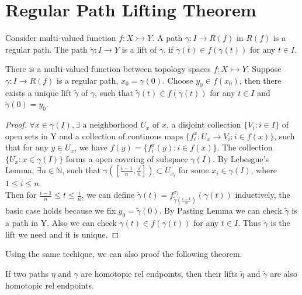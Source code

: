 \documentclass[12pt]{article}
\newenvironment{definition}[2][Definition]{\begin{trivlist}
\item[\hskip \labelsep {\bfseries #1}\hskip \labelsep {\bfseries #2.}]}{\end{trivlist}}
\newenvironment{theorem}[2][Theorem]{\begin{trivlist}
\item[\hskip \labelsep {\bfseries #1}\hskip \labelsep {\bfseries #2.}]}{\end{trivlist}}
\begin{document}
\section{Regular Path Lifting Theorem}
\begin{definition}{2.1}
    Consider multi-valued function $f:X\rightarrowtail Y$. A path $\gamma: I\to R(f)$ in $R(f)$ is a regular path. The path $\tilde{\gamma}:I\to Y$ is a lift of $\gamma$, if $\tilde{\gamma}(t) \in f(\gamma (t))$ for any $t\in I$.
\end{definition}
\begin{theorem}{2.2}
    There is a multi-valued function between topology spaces $f:X\rightarrowtail Y$.
    Suppose $\gamma:I\to R(f)$ is a regular path, $x_0 = \gamma(0)$. Choose $y_0\in f(x_0)$, then there exists a unique lift $\tilde{\gamma}$ of $\gamma$, such that $\tilde{\gamma}(t) \in f(\gamma (t))$ for any $t\in I$ and $\tilde{\gamma}(0)=y_0$.
\end{theorem}
\begin{proof}
    $\forall x\in\gamma(I),\exists \text{ a neighborhood } U_x \text{ of } x$, a disjoint collection $\{V_i:i\in I\}$ of open sets in Y and a collection of continous maps $\{f_i^x:U_x\to V_i:i\in f(x)\}$, such that for any $y\in U_x$, we have $f(y)=\{f_i^x(y):i\in f(x)\}$. The collection $\{U_x:x\in\gamma(I)\}$ forms a open covering of subspace $\gamma(I)$. By Lebesgue's Lemma, $\exists n \in \mathbb{N}$, such that $\gamma([\frac{i-1}{n},\frac{i}n{}]) \subset U_{x_i}$ for some $x_i\in \gamma(I)$, where $1\leq i\leq n$.\\

    Then for $\frac{i-1}{n}\leq t\leq \frac{i}{n}$, we can define $\tilde{\gamma}(t)=f^{x_i}_{\tilde{\gamma}(\frac{i-1}{n})} (\gamma(t))$ inductively, the basic case holds because we fix $y_0 = \tilde{\gamma}(0)$. By Pasting Lemma we can check $\tilde{\gamma}$ is a path in Y. Also we can check $\tilde{\gamma}(t) \in f(\gamma (t))$ for any $t\in I$. Thus $\tilde{\gamma}$ is the lift we need and it is unique.
    
\end{proof}
Using the same techique, we can also proof the following theorem.
    
\begin{theorem}{2.3}
    If two paths $\eta$ and $\gamma$ are homotopic rel endpoints, then their lifts $\tilde{\eta}$ and $\tilde{\gamma}$ are also homotopic rel endpoints.
\end{theorem}
\end{document}
